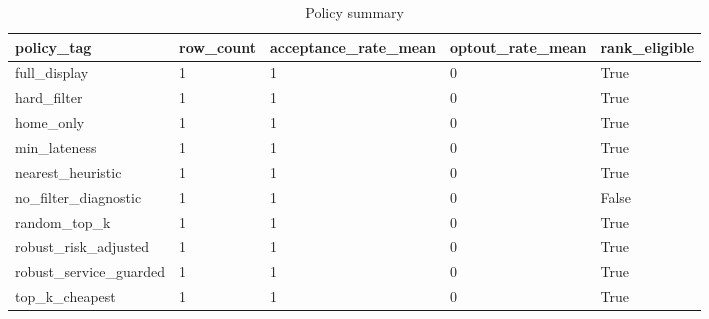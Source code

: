 \begin{table}[ht]
\centering
\begin{tabular}{lllll}
 \hline
policy\_tag & row\_count & acceptance\_rate\_mean & optout\_rate\_mean & rank\_eligible \\
 \hline
full\_display & 1 & 1 & 0 & True \\
hard\_filter & 1 & 1 & 0 & True \\
home\_only & 1 & 1 & 0 & True \\
min\_lateness & 1 & 1 & 0 & True \\
nearest\_heuristic & 1 & 1 & 0 & True \\
no\_filter\_diagnostic & 1 & 1 & 0 & False \\
random\_top\_k & 1 & 1 & 0 & True \\
robust\_risk\_adjusted & 1 & 1 & 0 & True \\
robust\_service\_guarded & 1 & 1 & 0 & True \\
top\_k\_cheapest & 1 & 1 & 0 & True \\
 \hline
\end{tabular}
\caption{Policy summary}
\end{table}
